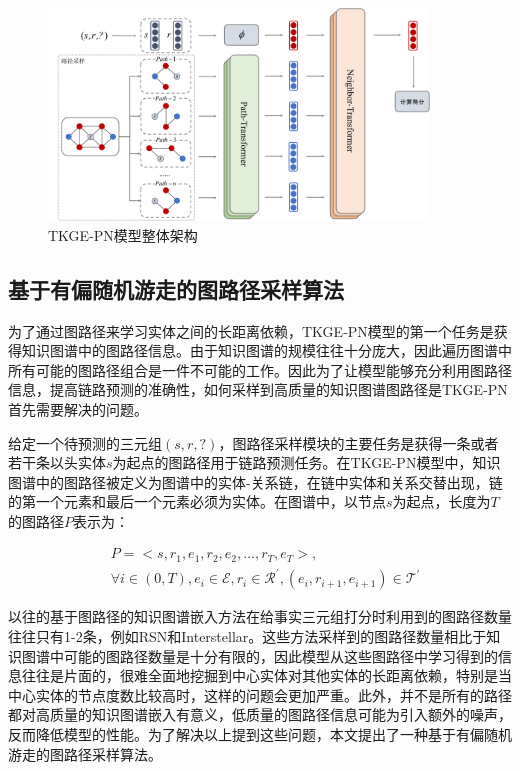 \begin{figure}[htbp]
  \centerline{\includegraphics[width=0.9\textwidth]{pic/TKGE-PN.pdf}}
  \caption{TKGE-PN模型整体架构}
  \label{TKGE-PN_architecture}
\end{figure}

\subsection{基于有偏随机游走的图路径采样算法}

为了通过图路径来学习实体之间的长距离依赖，TKGE-PN模型的第一个任务是获得知识图谱中的图路径信息。由于知识图谱的规模往往十分庞大，因此遍历图谱中所有可能的图路径组合是一件不可能的工作。因此为了让模型能够充分利用图路径信息，提高链路预测的准确性，如何采样到高质量的知识图谱图路径是TKGE-PN首先需要解决的问题。

给定一个待预测的三元组$(s,r,?)$，图路径采样模块的主要任务是获得一条或者若干条以头实体$s$为起点的图路径用于链路预测任务。在TKGE-PN模型中，知识图谱中的图路径被定义为图谱中的实体-关系链，在链中实体和关系交替出现，链的第一个元素和最后一个元素必须为实体。在图谱中，以节点$s$为起点，长度为$T$的图路径$P$表示为：

\begin{equation}
  \begin{aligned}
     &P=<s,r_1,e_1,r_2,e_2,...,r_T,e_T>, \\
     &{\forall}i \in (0,T),e_i\in\mathcal{E},r_i\in\mathcal{R}^{\prime},(e_i,r_{i+1},e_{i+1})\in\mathcal{T}^{\prime}
  \end{aligned}
\end{equation}

以往的基于图路径的知识图谱嵌入方法在给事实三元组打分时利用到的图路径数量往往只有1-2条，例如RSN和Interstellar。这些方法采样到的图路径数量相比于知识图谱中可能的图路径数量是十分有限的，因此模型从这些图路径中学习得到的信息往往是片面的，很难全面地挖掘到中心实体对其他实体的长距离依赖，特别是当中心实体的节点度数比较高时，这样的问题会更加严重。此外，并不是所有的路径都对高质量的知识图谱嵌入有意义，低质量的图路径信息可能为引入额外的噪声，反而降低模型的性能。为了解决以上提到这些问题，本文提出了一种基于有偏随机游走的图路径采样算法。

